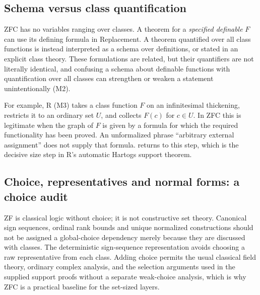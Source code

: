 \documentclass[11pt,letterpaper]{article}
\numberwithin{equation}{section}
\theoremstyle{definition}
\theoremstyle{remark}
\begin{document}
\subsection{Schema versus class quantification}
\label{found:sub:schema}
ZFC has no variables ranging over classes. A theorem for a \emph{specified
definable} $F$ can use its defining formula in Replacement. A theorem
quantified over all class functions is instead interpreted as a schema over
definitions, or stated in an explicit class theory. These formulations are
related, but their quantifiers are not literally identical, and confusing a
schema about definable functions with quantification over all classes can
strengthen or weaken a statement unintentionally (M2).

For example, R (M3) takes a class function $F$ on an infinitesimal thickening,
restricts it to an ordinary set $U$, and collects $F(c)$ for $c\in U$. In ZFC
this is legitimate when the graph of $F$ is given by a formula for which the
required functionality has been proved. An unformalized phrase ``arbitrary
external assignment'' does not supply that formula. 
returns to this step, which is the decisive size step in R's automatic Hartogs
support theorem.

\subsection{Choice, representatives and normal forms: a choice audit}
\label{found:sub:choice}
ZF is classical logic without choice; it is not constructive set theory.
Canonical sign sequences, ordinal rank bounds and unique normalized
constructions should not be assigned a global-choice dependency merely because
they are discussed with classes. The deterministic sign-sequence representation
avoids choosing a raw representative from each class. Adding choice permits the
usual classical field theory, ordinary complex analysis, and the selection
arguments used in the supplied support proofs without a separate weak-choice
analysis, which is why ZFC is a practical baseline for the set-sized layers.
\end{document}
